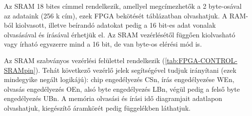	Az SRAM 18 bites címmel rendelkezik, amellyel megcímezhetők a 2 byte-osával az adataink (256 k cím), ezek FPGA bekötését  táblázatban olvashatjuk. A RAM-ból kiolvasott, illetve beírandó adatokat pedig a 16 bit-es adat vonalak olvasásával és írásával érhetjük el. Az SRAM vezérlésétől függően kiolvasható vagy írható egyszerre mind a 16 bit, de van byte-os elérési mód is.
	
	Az SRAM szabványos vezérlési felülettel rendelkezik (\ref{tab:FPGA-CONTROL-SRAMpin}). Tehát következő vezérlő jelek segítségével tudjuk irányítani (ezek mindegyike negált logikájú): chip engedélyezés CSn, írás engedélyezése WEn, olvasás engedélyezés OEn, alsó byte engedélyezés LBn, végül pedig a felső byte engedélyezés UBn. A memória olvasási és írási idő diagramjait  adatlapon olvashatjuk, kiegészítő áramkörét pedig  függelékben láthatjuk.     
	
